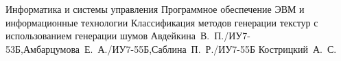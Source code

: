 \makeresearchtitle
{Информатика и системы управления} %
{Программное обеспечение ЭВМ и информационные технологии} %
{Классификация методов генерации текстур с использованием генерации шумов} %
{Авдейкина~В.~П./ИУ7-53Б,Амбарцумова~Е.~А./ИУ7-55Б,Саблина~П.~Р./ИУ7-55Б} %
{Кострицкий~А.~С.} %
{} %
